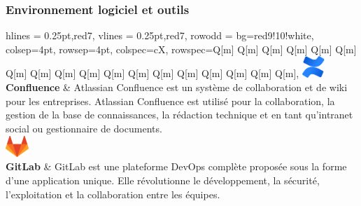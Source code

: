 \subsubsection{Environnement logiciel et outils}
\begin{longtblr}[caption={Environnements et outils de développement et de collaboration}]{
    hlines = {0.25pt,red7},
    vlines = {0.25pt,red7},
    row{odd} = {bg=red9!10!white},
    colsep=4pt,
    rowsep=4pt,
	colspec={cX},
    rowspec={Q[m] Q[m] Q[m] Q[m] Q[m] Q[m] Q[m] Q[m] Q[m] Q[m] Q[m] Q[m] Q[m] Q[m] Q[m] Q[m] Q[m] Q[m]},
}
{
\includegraphics[height=8mm]{images/sec5/confluence.pdf}
\\\textbf{Confluence}
}
& 
Atlassian Confluence est un système de collaboration et de wiki pour les entreprises.
Atlassian Confluence est utilisé pour la collaboration, la gestion de la base de connaissances, la rédaction technique et en tant qu'intranet social ou gestionnaire de documents.\\

{
\includegraphics[height=8mm]{images/sec5/gitlab.pdf}\\\textbf{GitLab}
}
& 
GitLab est une plateforme DevOps complète proposée sous la forme d'une application unique. Elle révolutionne le développement, la sécurité, l'exploitation et la collaboration entre les équipes. 
\\


\end{longtblr}
